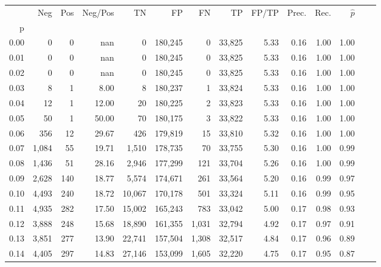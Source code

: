 \begin{tabular}{rrrrrrrrrrrrrr}
\toprule
{} &    Neg &    Pos & Neg/Pos &       TN &       FP &      FN &      TP & FP/TP & Prec. &  Rec. & $\hat{p}$ \\
p    &        &        &         &          &          &         &         &       &       &       &           \\
\midrule
0.00 &      0 &      0 &     nan &        0 &  180,245 &       0 &  33,825 &  5.33 &  0.16 &  1.00 &      1.00 \\
0.01 &      0 &      0 &     nan &        0 &  180,245 &       0 &  33,825 &  5.33 &  0.16 &  1.00 &      1.00 \\
0.02 &      0 &      0 &     nan &        0 &  180,245 &       0 &  33,825 &  5.33 &  0.16 &  1.00 &      1.00 \\
0.03 &      8 &      1 &    8.00 &        8 &  180,237 &       1 &  33,824 &  5.33 &  0.16 &  1.00 &      1.00 \\
0.04 &     12 &      1 &   12.00 &       20 &  180,225 &       2 &  33,823 &  5.33 &  0.16 &  1.00 &      1.00 \\
0.05 &     50 &      1 &   50.00 &       70 &  180,175 &       3 &  33,822 &  5.33 &  0.16 &  1.00 &      1.00 \\
0.06 &    356 &     12 &   29.67 &      426 &  179,819 &      15 &  33,810 &  5.32 &  0.16 &  1.00 &      1.00 \\
0.07 &  1,084 &     55 &   19.71 &    1,510 &  178,735 &      70 &  33,755 &  5.30 &  0.16 &  1.00 &      0.99 \\
0.08 &  1,436 &     51 &   28.16 &    2,946 &  177,299 &     121 &  33,704 &  5.26 &  0.16 &  1.00 &      0.99 \\
0.09 &  2,628 &    140 &   18.77 &    5,574 &  174,671 &     261 &  33,564 &  5.20 &  0.16 &  0.99 &      0.97 \\
0.10 &  4,493 &    240 &   18.72 &   10,067 &  170,178 &     501 &  33,324 &  5.11 &  0.16 &  0.99 &      0.95 \\
0.11 &  4,935 &    282 &   17.50 &   15,002 &  165,243 &     783 &  33,042 &  5.00 &  0.17 &  0.98 &      0.93 \\
0.12 &  3,888 &    248 &   15.68 &   18,890 &  161,355 &   1,031 &  32,794 &  4.92 &  0.17 &  0.97 &      0.91 \\
0.13 &  3,851 &    277 &   13.90 &   22,741 &  157,504 &   1,308 &  32,517 &  4.84 &  0.17 &  0.96 &      0.89 \\
0.14 &  4,405 &    297 &   14.83 &   27,146 &  153,099 &   1,605 &  32,220 &  4.75 &  0.17 &  0.95 &      0.87 \\

\end{tabular}
